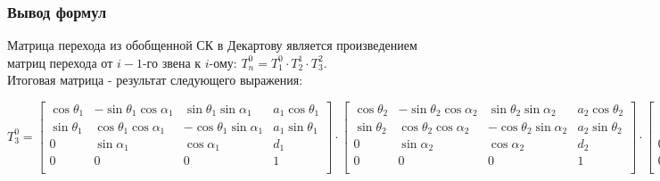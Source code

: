 \documentclass{article}
\begin{document}
\subsubsection*{Вывод формул}
Матрица перехода из обобщенной СК в Декартову является произведением матриц перехода от $i-1$-го звена к $i$-ому: $T^0_n=T^0_1 \cdot T^1_2 \cdot T^2_3 $. \\
Итоговая матрица - результат следующего выражения:
\begin{center}
$T^0_3 = \begin{bmatrix}
\cos{\theta_1} & -\sin{\theta_1} \cos{\alpha_1} & \sin{\theta_1} \sin{\alpha_1} & a_1 \cos{\theta_1} \\
\sin{\theta_1} & \cos{\theta_1} \cos{\alpha_1} & -\cos{\theta_1} \sin{\alpha_1} & a_1 \sin{\theta_1} \\
0 & \sin{\alpha_1} & \cos{\alpha_1} & d_1\\
0 & 0 & 0 & 1\\
\end{bmatrix}
\cdot
\begin{bmatrix}
\cos{\theta_2} & -\sin{\theta_2} \cos{\alpha_2} & \sin{\theta_2} \sin{\alpha_2} & a_2 \cos{\theta_2} \\
\sin{\theta_2} & \cos{\theta_2} \cos{\alpha_2} & -\cos{\theta_2} \sin{\alpha_2} & a_2 \sin{\theta_2} \\
0 & \sin{\alpha_2} & \cos{\alpha_2} & d_2\\
0 & 0 & 0 & 1\\
\end{bmatrix}
\cdot
\begin{bmatrix}
\cos{\theta_3} & -\sin{\theta_3} \cos{\alpha_3} & \sin{\theta_3} \sin{\alpha_3} & a_3 \cos{\theta_3} \\
\sin{\theta_3} & \cos{\theta_3} \cos{\alpha_3} & -\cos{\theta_3} \sin{\alpha_3} & a_3 \sin{\theta_3} \\
0 & \sin{\alpha_3} & \cos{\alpha_3} & d_3\\
0 & 0 & 0 & 1\\
\end{bmatrix}$
\end{center}
\end{document}
